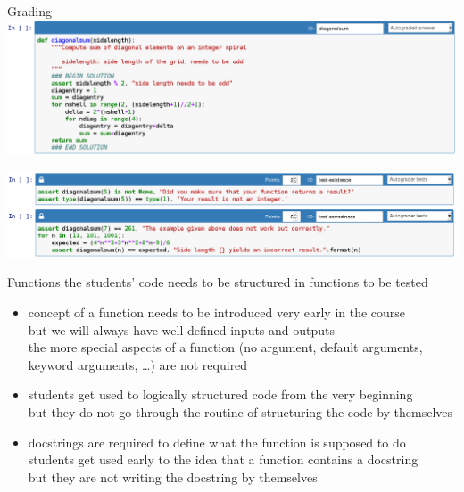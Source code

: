 \documentclass[svgnames]{beamer}
\begin{document}
\begin{frame}{Grading}
 \includegraphics[width=\textwidth]{function}

 \includegraphics[width=\textwidth]{tests}
\end{frame}

\begin{frame}{Functions}
 the students' code needs to be structured in functions to be tested
 \begin{itemize}
  \item concept of a function needs to be introduced very early in the course\\
	but we will always have well defined inputs and outputs\\
	the more special aspects of a function (no argument, default arguments,
	keyword arguments, \dots) are not required
  \item students get used to logically structured code from the very beginning\\
	but they do not go through the routine of structuring the code by themselves
  \item docstrings are required to define what the function is supposed to do\\
	students get used early to the idea that a function contains a docstring\\
	but they are not writing the docstring by themselves
 \end{itemize}
\end{frame}
\end{document}
